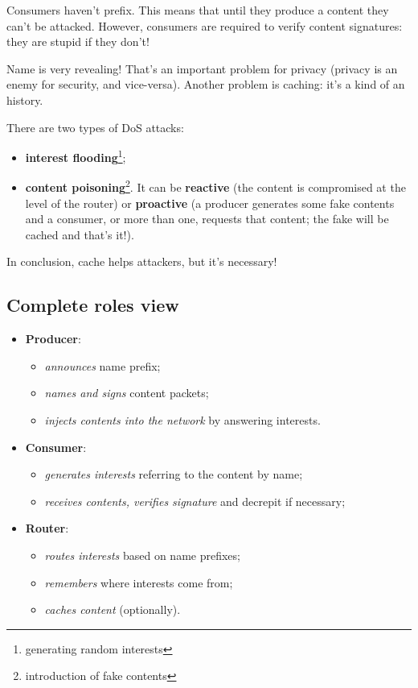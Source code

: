 Consumers haven't prefix. This means that until they produce a content they
can't be attacked. However, consumers are required to verify content
signatures: they are stupid if they don't!

Name is very revealing! That's an important problem for privacy (privacy is an
enemy for security, and vice-versa). Another problem is caching: it's a kind of
an history.

There are two types of DoS attacks:
\begin{itemize}
  \item \textbf{interest flooding}\footnote{generating random interests};
  \item \textbf{content poisoning}\footnote{introduction of fake contents}. It
can be \textbf{reactive} (the content is compromised at the level of the
router) or \textbf{proactive} (a producer generates some fake contents and a
consumer, or more than one, requests that content; the fake will be cached and
that's it!).
\end{itemize}
In conclusion, cache helps attackers, but it's necessary!

\subsection{Complete roles view}
\begin{itemize}
  \item \textbf{Producer}:
  \begin{itemize}
    \item \textit{announces} name prefix;
    \item \textit{names and signs} content packets;
    \item \textit{injects contents into the network} by answering interests.
  \end{itemize}
  \item \textbf{Consumer}:
  \begin{itemize}
    \item \textit{generates interests} referring to the content by name;
    \item \textit{receives contents, verifies signature} and decrepit if
necessary;
  \end{itemize}
  \item \textbf{Router}:
  \begin{itemize}
    \item \textit{routes interests} based on name prefixes;
    \item \textit{remembers} where interests come from;
    \item \textit{caches content} (optionally).
  \end{itemize}
\end{itemize}
